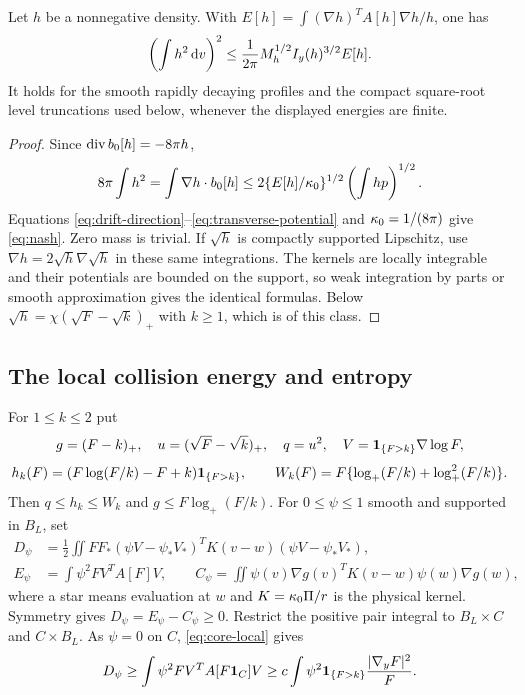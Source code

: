\begin{lemma}\label{lem:nash}
Let $h$ be a nonnegative density. With $E[h]=\int(\nabla h)^TA[h]\nabla h/h$, one has
\begin{equation}\label{eq:nash}
 \left(\int h^2\,\mathrm dv\right)^2\le\frac1{2\pi}
 M_h^{1/2}I_y(h)^{3/2}E[h].
\end{equation}
It holds for the smooth rapidly decaying profiles and the compact square-root level truncations used below, whenever the displayed energies are finite.
\end{lemma}
\begin{proof}
Since $\operatorname{div} b_0[h]=-8\pi h$,
\[
 8\pi\int h^2=\int\nabla h\cdot b_0[h]
 \le2\{E[h]/\kappa_0\}^{1/2}\left(\int hp\right)^{1/2}.
\]
Equations \eqref{eq:drift-direction}--\eqref{eq:transverse-potential} and $\kappa_0=1/(8\pi)$ give \eqref{eq:nash}. Zero mass is trivial. If $\sqrt h$ is compactly supported Lipschitz, use $\nabla h=2\sqrt h\nabla\sqrt h$ in these same integrations. The kernels are locally integrable and their potentials are bounded on the support, so weak integration by parts or smooth approximation gives the identical formulas. Below $\sqrt h=\chi(\sqrt F-\sqrt k)_+$ with $k\ge1$, which is of this class.
\end{proof}

\subsection{The local collision energy and entropy}

For $1\le k\le2$ put
\[
 g=(F-k)_+,\quad u=(\sqrt F-\sqrt k)_+,\quad q=u^2,\quad
 V=\mathbf 1_{\{F>k\}}\nabla\log F,
\]
\[
 h_k(F)=(F\log(F/k)-F+k)\mathbf 1_{\{F>k\}},\qquad
 W_k(F)=F\{\log_+(F/k)+\log_+^2(F/k)\}.
\]
Then $q\le h_k\le W_k$ and $g\le F\log_+(F/k)$.
For $0\le\psi\le1$ smooth and supported in $B_L$, set
\begin{align*}
 D_\psi&=\frac12\iint FF_*
 (\psi V-\psi_*V_*)^TK(v-w)(\psi V-\psi_*V_*),\\
 E_\psi&=\int\psi^2FV^TA[F]V,\qquad
 C_\psi=\iint\psi(v)\nabla g(v)^TK(v-w)\psi(w)\nabla g(w),
\end{align*}
where a star means evaluation at $w$ and $K=\kappa_0\Pi/r$ is the physical kernel. Symmetry gives $D_\psi=E_\psi-C_\psi\ge0$.
Restrict the positive pair integral to $B_L\times C$ and $C\times B_L$. As $\psi=0$ on $C$, \eqref{eq:core-local} gives
\begin{equation}\label{eq:pair-core}
 D_\psi\ge\int\psi^2FV^TA[F\mathbf 1_C]V
 \ge c\int\psi^2\mathbf 1_{\{F>k\}}\frac{|\nabla_yF|^2}{F}.
\end{equation}


